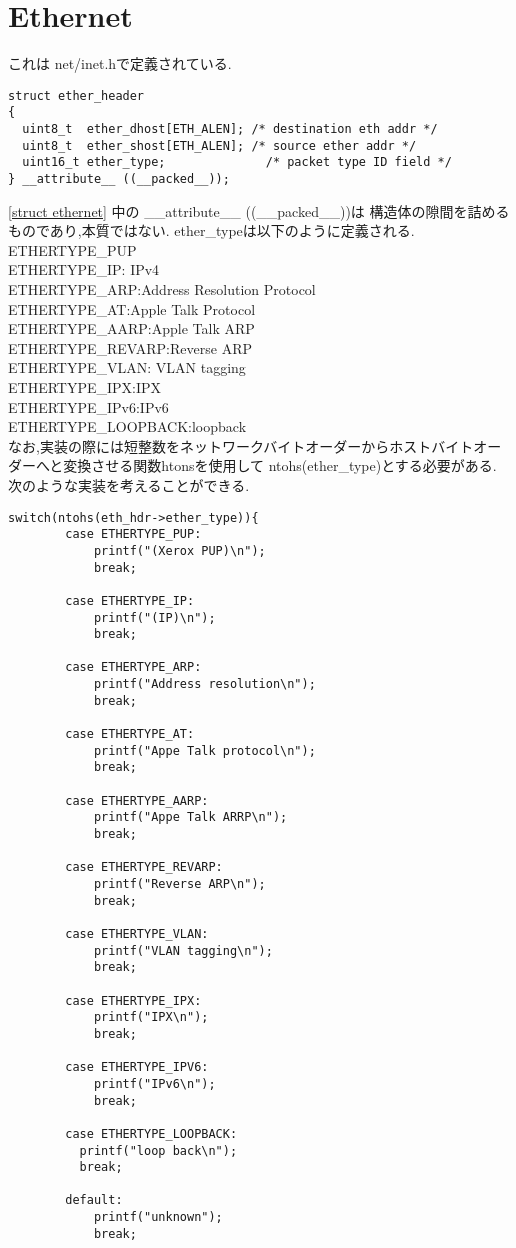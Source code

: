 \documentclass[a4paper]{article}%
\begin{document}
\section{Ethernet}
これは net/inet.hで定義されている.
\begin{lstlisting}[caption=ethernet\_header構造体,label=struct ethernet]
struct ether_header
{
  uint8_t  ether_dhost[ETH_ALEN]; /* destination eth addr */
  uint8_t  ether_shost[ETH_ALEN]; /* source ether addr */
  uint16_t ether_type;              /* packet type ID field */
} __attribute__ ((__packed__));
\end{lstlisting}
\ref{struct ethernet} 中の \_\_attribute\_\_ ((\_\_packed\_\_))は 構造体の隙間を詰めるものであり,本質ではない.
ether\_typeは以下のように定義される. \\
ETHERTYPE\_PUP  \\
ETHERTYPE\_IP: IPv4 \\
ETHERTYPE\_ARP:Address Resolution Protocol \\
ETHERTYPE\_AT:Apple Talk Protocol\\
ETHERTYPE\_AARP:Apple Talk ARP \\
ETHERTYPE\_REVARP:Reverse ARP \\
ETHERTYPE\_VLAN: VLAN tagging \\
ETHERTYPE\_IPX:IPX\\
ETHERTYPE\_IPv6:IPv6 \\
ETHERTYPE\_LOOPBACK:loopback\\
なお,実装の際には短整数をネットワークバイトオーダーからホストバイトオーダーへと変換させる関数htonsを使用して
 ntohs(ether\_type)とする必要がある.　次のような実装を考えることができる.
\begin{lstlisting}[caption=hoge,label=hoge]
    switch(ntohs(eth_hdr->ether_type)){
        case ETHERTYPE_PUP:
            printf("(Xerox PUP)\n");
            break;
        
        case ETHERTYPE_IP:
            printf("(IP)\n");
            break;
        
        case ETHERTYPE_ARP:
            printf("Address resolution\n");
            break;

        case ETHERTYPE_AT:
            printf("Appe Talk protocol\n");
            break;
            
        case ETHERTYPE_AARP:
            printf("Appe Talk ARRP\n");
            break;
            
        case ETHERTYPE_REVARP:
            printf("Reverse ARP\n");
            break; 
            
        case ETHERTYPE_VLAN:
            printf("VLAN tagging\n");
            break;
            
        case ETHERTYPE_IPX:
            printf("IPX\n");
            break;
            
        case ETHERTYPE_IPV6:
            printf("IPv6\n");
            break;
            
        case ETHERTYPE_LOOPBACK:
          printf("loop back\n");
          break;
          
        default:
            printf("unknown");
            break;

\end{lstlisting}
\end{document}
